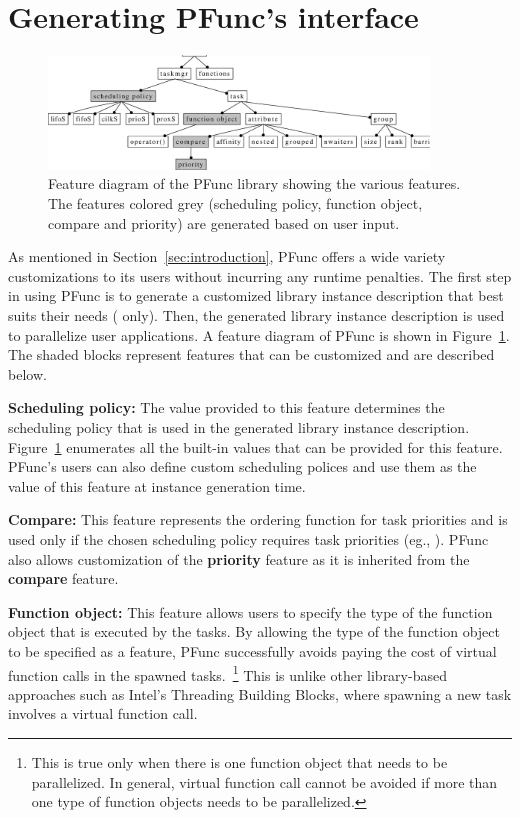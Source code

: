 \section{Generating PFunc's interface}
\label{sec:generate}

\begin{figure}[t]
\centering
\includegraphics[width=0.90\textwidth]{figs/pfunc}
\caption{Feature diagram of the PFunc library showing the various features.
The features colored grey (scheduling policy, function object, compare and
priority) are generated based on user input.}
\label{fig:pfunc}
\end{figure}

As mentioned in Section~\ref{sec:introduction}, PFunc offers a wide variety
customizations to its users without incurring any runtime penalties. The first
step in using PFunc is to generate a customized library instance description
that best suits their needs (\Cpp{} only).  Then, the generated library
instance description is used to parallelize user applications. A feature
diagram of PFunc is shown in Figure~\ref{fig:pfunc}. The shaded blocks
represent features that can be customized and are described below.

\begin{list}{}{\leftmargin=1em}
\item \textbf{Scheduling policy:}
The value provided to this feature determines the scheduling policy that is
used in the generated library instance description.  Figure~\ref{fig:pfunc}
enumerates all the built-in values that can be provided for this feature.
PFunc's users can also define custom scheduling polices and use them as the
value of this feature at instance generation time.
\item \textbf{Compare:}
This feature represents the ordering function for task priorities and is used
only if the chosen scheduling policy requires task priorities (eg.,
).  PFunc also allows customization of the \textbf{priority}
feature as it is inherited from the \textbf{compare} feature.
\item \textbf{Function object:}
This feature allows users to specify the type of the function object that is
executed by the tasks.  By allowing the type of the function object to be
specified as a feature, PFunc successfully avoids paying the cost of virtual
function calls in the spawned tasks.~\footnote{This is true only when there is 
one function object that needs to be parallelized. In general, virtual function
call cannot be avoided if more than one type of function objects needs to be 
parallelized.} This is unlike other library-based approaches such as Intel's
Threading Building Blocks, where spawning a new task involves a virtual
function call.  
\end{list}

